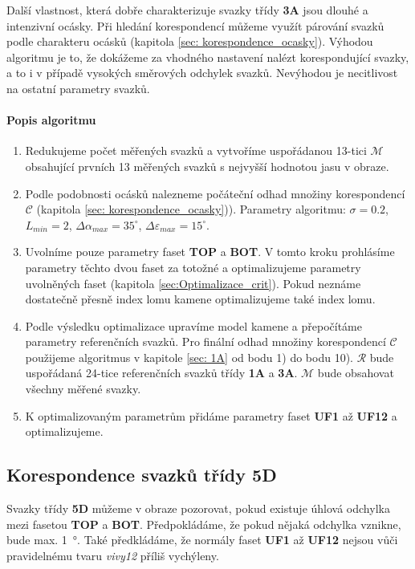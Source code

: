 	Další vlastnost, která dobře charakterizuje svazky třídy \textbf{3A} jsou dlouhé a intenzivní ocásky. Při hledání korespondencí můžeme využít párování svazků podle charakteru ocásků (kapitola \ref{sec: korespondence_ocasky}). Výhodou algoritmu je to, že dokážeme za vhodného nastavení nalézt korespondující svazky, a to i v případě vysokých směrových odchylek svazků. Nevýhodou je necitlivost na ostatní parametry svazků. 

\paragraph{Popis algoritmu} 

\begin{enumerate}
	\item Redukujeme počet měřených svazků a vytvoříme uspořádanou 13-tici $\mathcal{M}$ obsahující prvních 13 měřených svazků s nejvyšší hodnotou jasu v obraze. 

	\item Podle podobnosti ocásků nalezneme počáteční odhad množiny korespondencí $\mathcal{C}$ (kapitola \ref{sec: korespondence_ocasky})). Parametry algoritmu: $\sigma = 0.2$, $L_{min} = 2$, $\Delta\alpha_{max} = 35^\circ$, $\Delta\varepsilon_{max} = 15^\circ$.
	
	\item Uvolníme pouze parametry faset \textbf{TOP} a \textbf{BOT}. V tomto kroku prohlásíme parametry těchto dvou faset za totožné a optimalizujeme parametry uvolněných faset (kapitola \ref{sec:Optimalizace_crit}). Pokud neznáme dostatečně přesně index lomu kamene optimalizujeme také index lomu. 
	
	\item Podle výsledku optimalizace upravíme model kamene a přepočítáme parametry referenčních svazků. Pro finální odhad množiny korespondencí $\mathcal{C}$ použijeme algoritmus v kapitole \ref{sec: 1A} od bodu 1) do bodu 10). $\mathcal{R}$ bude uspořádaná 24-tice referenčních svazků třídy \textbf{1A} a \textbf{3A}. $\mathcal{M}$ bude obsahovat všechny měřené svazky.  
	
	\item K optimalizovaným parametrům přidáme parametry faset \textbf{UF1} až \textbf{UF12} a optimalizujeme. 
		
\end{enumerate}

\newpage
\subsection{Korespondence svazků třídy \textbf{5D}}
\label{sec:5D}
	Svazky třídy \textbf{5D} můžeme v obraze pozorovat, pokud existuje úhlová odchylka mezi fasetou \textbf{TOP} a \textbf{BOT}. Předpokládáme, že pokud nějaká odchylka vznikne, bude max. \SI{1}{\degree}. Také předkládáme, že normály faset \textbf{UF1} až \textbf{UF12} nejsou vůči pravidelnému tvaru \textit{vivy12} příliš vychýleny.
	
